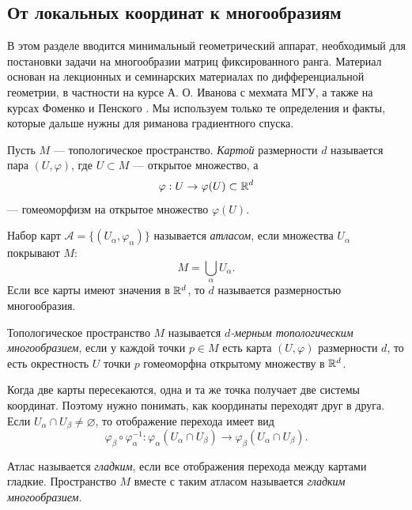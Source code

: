 \subsection{От локальных координат к многообразиям}

В этом разделе вводится минимальный геометрический аппарат, необходимый для постановки задачи на многообразии матриц фиксированного ранга. Материал основан на лекционных и семинарских материалах по дифференциальной геометрии, в частности на курсе А. О. Иванова с мехмата МГУ, а также на курсах Фоменко и Пенского \cite{ivanov-dg,fomenko-dg,penskoy-seminars}. Мы используем только те определения и факты, которые дальше нужны для риманова градиентного спуска.

\begin{definition}
Пусть $M$ --- топологическое пространство. \textit{Картой} размерности $d$ называется пара $(U,\varphi)$, где $U\subset M$ --- открытое множество, а
\[
\varphi:U\to \varphi(U)\subset \mathbb{R}^d
\]
--- гомеоморфизм на открытое множество $\varphi(U)$.
\end{definition}

\begin{definition}
Набор карт $\mathcal A=\{(U_\alpha,\varphi_\alpha)\}$ называется \textit{атласом}, если множества $U_\alpha$ покрывают $M$:
\[
M=\bigcup_\alpha U_\alpha.
\]
Если все карты имеют значения в $\mathbb{R}^d$, то $d$ называется размерностью многообразия.
\end{definition}

\begin{definition}
Топологическое пространство $M$ называется \textit{$d$-мерным топологическим многообразием}, если у каждой точки $p\in M$ есть карта $(U,\varphi)$ размерности $d$, то есть окрестность $U$ точки $p$ гомеоморфна открытому множеству в $\mathbb{R}^d$.
\end{definition}

Когда две карты пересекаются, одна и та же точка получает две системы координат. Поэтому нужно понимать, как координаты переходят друг в друга. Если $U_\alpha\cap U_\beta\ne\varnothing$, то отображение перехода имеет вид
\[
\varphi_\beta\circ\varphi_\alpha^{-1}:
\varphi_\alpha(U_\alpha\cap U_\beta)
\to
\varphi_\beta(U_\alpha\cap U_\beta).
\]

\begin{definition}
Атлас называется \textit{гладким}, если все отображения перехода между картами гладкие. Пространство $M$ вместе с таким атласом называется \textit{гладким многообразием}.
\end{definition}

